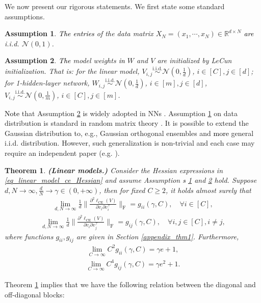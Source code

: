 \documentclass{article}
\newcommand{\rw}{\rightarrow}
\newcommand{\1}{^{(1)}}
\newcommand{\2}{^{(2)}}
\newtheorem{thm}{Theorem}
\newtheorem{assum}{Assumption}
\newcommand{\bea}{\begin{equation}\begin{aligned}}
\newcommand{\eea}{\end{aligned}\end{equation}}
\newcommand{\zhaoruirevise}[1]{\textcolor{black}{ #1}}
\begin{document}
We now present our rigorous statements. 
We first state some standard assumptions. 
\begin{assum}
\label{assum_1}
   \zhaoruirevise{The entries} of the data matrix $X_N=(x_1,\cdots,x_N) \in \mathbb{R}^{d\times N}$ \zhaoruirevise{are} i.i.d. $\mathcal{N}(0,1)$. 
\end{assum}
\begin{assum}
\label{assum_2}
    \zhaoruirevise{The} model weights \zhaoruirevise{in} $W$ and $V$ are initialized by LeCun initialization. That is: for the linear model, $V_{i,j}\overset{\operatorname{i.i.d.}}{\sim}\mathcal{N}(0, \frac{1}{d})$, $i\in[C],j\in[d]$; for 1-hidden-layer network, $W_{i,j}\overset{\operatorname{i.i.d.}}{\sim}\mathcal{N}(0, \frac{1}{d})$, $i\in[m],j\in[d]$,  $V_{i,j}\overset{\operatorname{i.i.d.}}{\sim}\mathcal{N}(0, \frac{1}{m})$, $i\in[C],j\in[m]$. 
\end{assum}
\zhaoruirevise{Note} that Assumption \ref{assum_2} is widely adopted in NNs \citep{sun2019optimization}. Assumption \ref{assum_1} on data distribution is standard in random matrix theory \citep{pastur2020random}. It is possible to extend the  Gaussian distribution to, 
 e.g., Gaussian orthogonal ensembles and \zhaoruirevise{more} general i.i.d. distribution. However, such generalization is non-trivial and each case may require an independent paper (e.g. \citet{pastur2022haarorthogonal,pastur2023iid}).
\begin{thm}
\label{thm_linear_model}
    {\bf (Linear models.)}  Consider the Hessian expressions in \eqref{eq_linear_model_ce_Hessian} and assume Assumption\zhaoruirevise{s} \ref{assum_1} and \ref{assum_2} hold. Suppose  $d,N\rw\infty, \frac
    {d}{N}\rw \gamma\in (0,+\infty)$, then for fixed $C\geq 2$, it holds almost surely that
        \bea\label{eq1thm3}
        \lim_{d,N\rw \infty}\frac{1}{d}\bigg\|\frac{\partial^2\ell_{\text{CE}}(V)}{\partial v_i  \partial v_i^\top}\bigg\|_{\operatorname{F}} = g_{ii}(\gamma,C),\quad \forall i \in [C],
        \eea
        \bea\label{eq2thm3}
        \lim_{d,N\rw \infty}\frac{1}{d}\bigg\|\frac{\partial^2\ell_{\text{CE}}(V)}{\partial v_i  \partial v_j^\top}\bigg\|_{\operatorname{F}} = g_{ij}(\gamma,C),\quad \forall i,j \in [C], i \ne j,
        \eea
    where functions $g_{ii},g_{ij}$ are given in Section \ref{appendix_thm1}. Furthermore,
\bea\label{eq3thm3}
\lim_{C\rw\infty}C^2 g_{ii}(\gamma,C)=\gamma e+1,  
\eea
\bea\label{eq4thm3}
\lim_{C\rw\infty}C^4 g_{ij}(\gamma,C)=\gamma e^2+1.  
\eea
\end{thm}
Theorem \ref{thm_linear_model} implies that we have the following relation between the diagonal and off-diagonal blocks:
\end{document}
